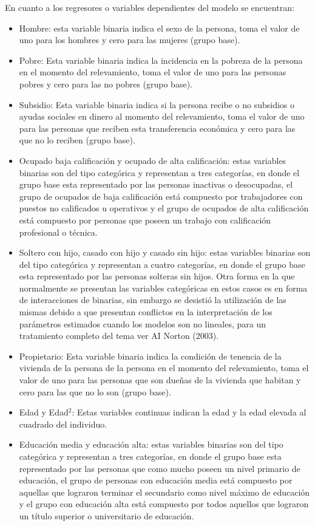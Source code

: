 \documentclass[12pt,a4paper]{article}
\begin{document}
En cuanto a los regresores o variables dependientes del modelo se encuentran:
\begin{itemize}
\item Hombre: esta variable binaria indica el sexo de la persona, toma el valor de uno para los hombres y cero para las mujeres (grupo base).
\item Pobre: Esta variable binaria indica la incidencia en la pobreza de la persona en el momento del relevamiento, toma el valor de uno para las personas pobres y cero para las no pobres (grupo base).
\item Subsidio: Esta variable binaria indica si la persona recibe o no  subsidios o ayudas sociales en dinero al momento del relevamiento, toma el valor de uno para las personas que reciben esta transferencia económica y cero para las que no lo reciben (grupo base).
\item Ocupado baja calificación y ocupado de alta calificación: estas variables binarias son del tipo categórica y representan a tres categorías, en donde el grupo base esta representado por las personas inactivas o desocupadas, el grupo de ocupados de baja calificación está compuesto por trabajadores con puestos no calificados u operativos y el grupo de ocupados de alta calificación está compuesto por personas que poseen un trabajo con calificación profesional o técnica.
\item Soltero con hijo, casado con hijo y casado sin hijo: estas variables binarias son del tipo categórica y representan a cuatro categorías, en donde el grupo base esta representado por las personas solteras sin hijos. Otra forma en la que normalmente se presentan las variables categóricas en estos casos es en forma de interacciones de binarias, sin embargo se desistió la utilización de las mismas debido a que presentan conflictos en la interpretación de los parámetros estimados cuando los modelos son no lineales, para un tratamiento completo del tema ver  AI Norton (2003).
\item Propietario: Esta variable binaria indica la condición de tenencia de la vivienda de la persona de la persona en el momento del relevamiento, toma el valor de uno para las personas que son dueñas de la vivienda que habitan y cero para las que no lo son (grupo base).
\item Edad y Edad$^{2}$: Estas variables continuas indican la edad  y la edad elevada al cuadrado del individuo. 
\item Educación media y educación alta: estas variables binarias son del tipo categórica y representan a tres categorías, en donde el grupo base esta representado por las personas que como mucho poseen un nivel primario de educación, el grupo de personas con educación media está compuesto por aquellas que lograron terminar el secundario como nivel máximo de educación y el grupo con educación alta está compuesto por todos aquellos que lograron un título superior o universitario de educación.
\end{itemize}
\end{document}
